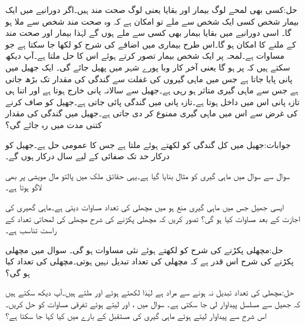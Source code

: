 حل:کسی بھی لمحے  لوگ بیمار اور بقایا یعنی  لوگ صحت مند ہیں۔اگر  دورانیے میں ایک بیمار شخص کسی ایک شخص سے ملے تو  امکان ہے کہ وہ صحت مند شخص سے ملا ہو گا۔ اسی دورانیے میں بقایا بیمار بھی کسی سے ملے ہوں گے لہٰذا بیمار اور صحت مند کے ملنے کا امکان    ہو گا۔اس طرح  بیماری میں اضافے کی شرح  کو  لکھا جا سکتا ہے جو مساوات  ہے۔لمحہ  پر ایک شخص بیمار تصور کرتے ہوئے  اس کا  حل
  ملتا ہے۔آپ دیکھ سکتے ہیں کہ  پر  ہو گا یعنی آخر کار وبا پورے شہر میں پھیل جائے گی۔
ایک جھیل میں  پانی پایا جاتا ہے جس میں ماہی گیروں کی غفلت سے گندگی کی مقدار   تک بڑھ جاتی ہے جس سے  ماہی گیری  متاثر ہو رہی ہے۔جھیل سے سالانہ   پانی خارج ہوتا ہے اور اتنا ہی تازہ پانی اس میں داخل ہوتا ہے۔تازہ پانی میں  گندگی پائی جاتی ہے۔جھیل کو صاف کرنے کی غرض سے اس میں ماہی گیری ممنوع کر دی جاتی ہے۔جھیل میں گندگی کی مقدار کتنی مدت میں  رہ جائے گی؟

جوابات:جھیل میں کل گندگی کو  لکھتے ہوئے  ملتا ہے جس کا عمومی حل  ہے۔جھیل کو درکار حد تک صفائی کے لیے  سال درکار ہوں گے۔

سوال  سے سوال  میں ماہی گیری کو مثال بنایا گیا ہے۔یہی حقائق ملک میں پالتو مال مویشی  پر بھی لاگو ہوتا ہے۔

ایسی جھیل جس میں ماہی گیری منع ہو میں مچھلی کی تعداد مساوات  دیتی ہے۔ماہی گھیری کی اجازت کے بعد مساوات کیا ہو گی؟ تصور  کریں کہ مچھلی پکڑنے کی شرح مچھلی کی لمحاتی تعداد کے راست تناسب ہے۔

حل:مچھلی پکڑنے کی شرح کو  لکھتے ہوئے نئی مساوات  ہو گی۔ 
سوال  میں مچھلی پکڑنے کی شرح اس قدر ہے کہ مچھلی کی تعداد تبدیل نہیں ہوتی۔مچھلی کی تعداد کیا ہو گی؟

حل:مچھلی کی تعداد تبدیل نہ ہونے سے مراد  ہے لہٰذا  لکھتے ہوئے  اور  ملتے ہیں۔آپ دیکھ سکتے ہیں کہ جھیل سے مسلسل  پیداوار لی جا سکتی ہے۔
سوال  میں ،  اور  لیتے ہوئے تفرقی مساوات کو حل کریں۔ اس شرح سے پیداوار لیتے ہوئے ماہی گیری کی مستقبل کے بارے میں کیا کہا جا سکتا ہے؟

